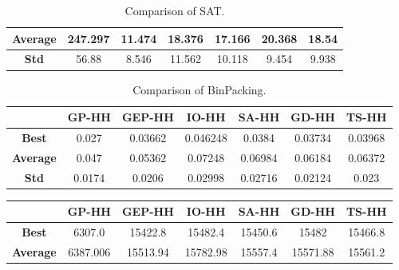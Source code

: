 \documentclass[a4paper,12pt]{article}
\begin{document}
{\begin{table}[h!]
\begin{tabular}{| c | c | c | c | c| c| c|}
                    \hline
                    \textbf{Average} & 247.297 & 11.474& 18.376& 17.166& 20.368&18.54\\
                    \hline
                    \textbf{Std} & 56.88 & 8.546& 11.562& 10.118& 9.454&9.938\\
                    \hline
                \end{tabular}
                \caption{Comparison of SAT.} 
        \end{table} 
        \begin{table}[h!] 
                \small 
                \centering
                \begin{tabular}{| c | c | c | c | c| c| c|} 
                    \hline   
                    &\textbf{GP-HH} & \textbf{GEP-HH} & \textbf{IO-HH} & \textbf{SA-HH} & \textbf{GD-HH} & \textbf{TS-HH} \\
                    \hline
                    \textbf{Best}  & 0.027 &0.03662 & 0.046248& 0.0384& 0.03734&0.03968\\
                    \hline
                    \textbf{Average} & 0.047 & 0.05362& 0.07248& 0.06984& 0.06184&0.06372\\
                    \hline
                    \textbf{Std} & 0.0174 & 0.0206& 0.02998& 0.02716& 0.02124&0.023\\
                    \hline
                \end{tabular}
                \caption{Comparison of BinPacking.} 
        \end{table} 
        \begin{table}[h!] 
                \small 
                \centering
                \begin{tabular}{| c | c | c | c | c| c| c|} 
                    \hline   
                    &\textbf{GP-HH} & \textbf{GEP-HH} & \textbf{IO-HH} & \textbf{SA-HH} & \textbf{GD-HH} & \textbf{TS-HH} \\
                    \hline
                    \textbf{Best} &  6307.0 &15422.8& 15482.4& 15450.6& 15482& 15466.8\\
                    \hline
                    \textbf{Average} & 6387.006 & 15513.94& 15782.98& 15557.4& 15571.88& 15561.2\\

\end{tabular}
\end{table}}
\end{document}
